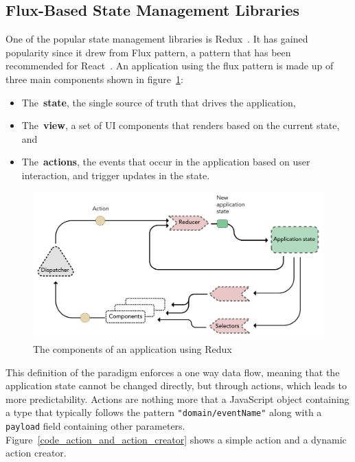 \clearpage
\clearpage
\hypertarget{flux-based-state-management-libraries}{%
\subsection{Flux-Based State Management
Libraries}\label{flux-based-state-management-libraries}}

One of the popular state management libraries is Redux~\cite{redux}. It has
gained popularity since it drew from Flux pattern, a pattern that has
been recommended for React~\cite{flux_recommendation}. An
application using the flux pattern is made up of three main components
shown in figure~\ref{image_redux_simple}:

\begin{itemize}
\tightlist
\item
  The~\textbf{state}, the single source of truth that drives the
  application,
\item
  The~\textbf{view}, a set of UI components that renders based on the
  current state, and
\item
  The~\textbf{actions}, the events that occur in the application based
  on user interaction, and trigger updates in the state.
\end{itemize}

\begin{figure}
\centering
\includegraphics{images/redux}
\caption{The components of an application using Redux}
\label{image_redux_simple}
\end{figure}

This definition of the paradigm enforces a one way data flow, meaning
that the application state cannot be changed directly, but through
actions, which leads to more predictability. Actions are nothing more
that a JavaScript object containing a type that typically follows the
pattern \texttt{"domain/eventName"} along with a \texttt{payload} field
containing other parameters. Figure~\ref{code_action_and_action_creator} shows a simple action
and a dynamic action creator.

